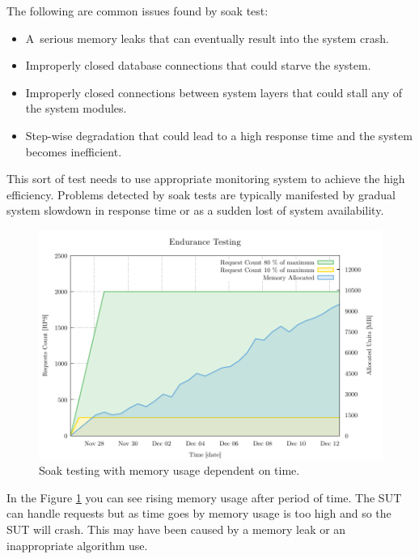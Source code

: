 The following are common issues found by soak test:
\begin{itemize}
	\setlength\itemsep{0em}
	\item A~serious memory leaks that can eventually result into the system crash.
	\item Improperly closed database connections that could starve the system.
	\item Improperly closed connections between system layers that could stall any of the system modules.
	\item Step-wise degradation that could lead to a high response time and the system becomes inefficient.
\end{itemize}


This sort of test needs to use appropriate monitoring system to achieve the high efficiency. Problems detected by soak tests are typically manifested by gradual system slowdown in response time or as a sudden lost of system availability.

\begin{figure}[H]
  \centering
  \includegraphics[width=15cm]{obrazky-figures/soak_testing.pdf}
  \caption{Soak testing with memory usage dependent on time.}
  \label{fig:soak_test}
\end{figure}

In the Figure \ref{fig:soak_test} you can see rising memory usage after period of time. The SUT can handle requests but as time goes by memory usage is too high and so the SUT will crash. This may have been caused by a memory leak or an inappropriate algorithm use.

